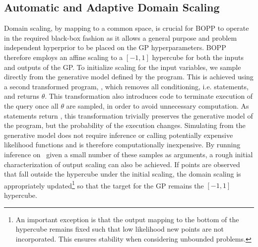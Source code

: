 
\subsection{Automatic and Adaptive Domain Scaling}
\label{sec:domain}

Domain scaling, by mapping to a common space, is crucial for BOPP to operate in the required black-box fashion as it allows a general purpose and problem independent hyperprior to be placed on the GP hyperparameters.  BOPP therefore employs an affine scaling to a $[-1,1]$ hypercube for both the inputs and outputs of the GP.  To initialize scaling for the input variables, we sample directly from the generative model defined by the program. %
This is achieved using a second transformed program, \qprior, which removes all conditioning, i.e. \observe statements, and returns $\theta$.  This transformation also introduces code to terminate execution of the query once all $\theta$ are sampled, in order to avoid unnecessary computation.  As \observe statements return , this transformation trivially preserves the generative model of the program, but the probability of the execution changes.  Simulating from the generative model does not require inference or calling potentially expensive likelihood functions and is therefore computationally inexpensive.   By running inference on \qmarg~given a small number of these samples as arguments, a rough initial characterization of output scaling can also be achieved.  If points are observed that fall outside the hypercube under the initial scaling, the domain scaling is appropriately updated\footnote{An important exception is that the output mapping to the bottom of the hypercube remains fixed such that low likelihood new points are not incorporated.  This ensures stability when considering unbounded problems.} so that the target for the GP remains the $[-1,1]$ hypercube.


